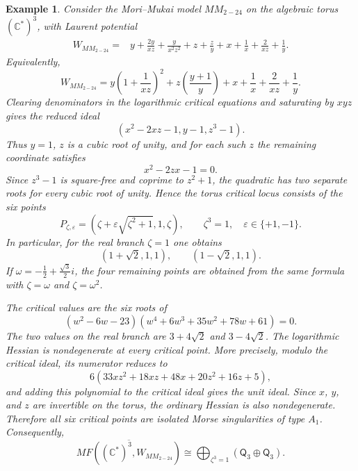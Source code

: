 \documentclass[11pt]{amsart}
\newtheorem{example}{Example}[section]
\newcommand{\MorseCat}[1]{\mathsf{Q}_{#1}}
\begin{document}
\begin{example}
Consider the Mori--Mukai model $MM_{2-24}$ on the algebraic torus
$(\mathbb{C}^*)^3$, with Laurent potential
\begin{align*}
W_{MM_{2-24}}={}&y+\frac{2y}{xz}+\frac{y}{x^2z^2}
+z+\frac{z}{y}+x+\frac{1}{x}+\frac{2}{xz}+\frac{1}{y}.
\end{align*}
Equivalently,
\[
W_{MM_{2-24}}
=y\left(1+\frac{1}{xz}\right)^2
+z\left(\frac{y+1}{y}\right)+x+\frac{1}{x}+\frac{2}{xz}+\frac{1}{y}.
\]
Clearing denominators in the logarithmic critical equations and saturating by
$xyz$ gives the reduced ideal
\[
\left(
 x^2-2xz-1,
 y-1,
 z^3-1
\right).
\]
Thus $y=1$, $z$ is a cubic root of unity, and for each such $z$ the remaining
coordinate satisfies
\[
x^2-2zx-1=0.
\]
Since $z^3-1$ is square-free and coprime to $z^2+1$, the quadratic has two
separate roots for every cubic root of unity. Hence the torus critical locus
consists of the six points
\[
P_{\zeta,\varepsilon}=\left(
\zeta+\varepsilon\sqrt{\zeta^2+1},1,\zeta
\right),
\qquad
\zeta^3=1,
\quad
\varepsilon\in\{+1,-1\}.
\]
In particular, for the real branch $\zeta=1$ one obtains
\[
(1+\sqrt{2},1,1),
\qquad
(1-\sqrt{2},1,1).
\]
If $\omega=-\frac12+\frac{\sqrt3}{2}i$, the four remaining points are obtained
from the same formula with $\zeta=\omega$ and $\zeta=\omega^2$.

The critical values are the six roots of
\[
(w^2-6w-23)(w^4+6w^3+35w^2+78w+61)=0.
\]
The two values on the real branch are $3+4\sqrt2$ and $3-4\sqrt2$. The
logarithmic Hessian is nondegenerate at every critical point. More precisely,
modulo the critical ideal, its numerator reduces to
\[
6(33xz^2+18xz+48x+20z^2+16z+5),
\]
and adding this polynomial to the critical ideal gives the unit ideal. Since
$x$, $y$, and $z$ are invertible on the torus, the ordinary Hessian is also
nondegenerate. Therefore all six critical points are isolated Morse
singularities of type $A_1$. Consequently,
\[
\overline{MF((\mathbb{C}^*)^3,W_{MM_{2-24}})}
\cong \bigoplus_{\zeta^3=1}\left(\MorseCat{3}\oplus \MorseCat{3}\right).
\]
\end{example}
\end{document}
